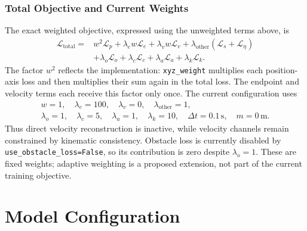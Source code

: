 \documentclass[12pt]{article}
\begin{document}
\subsubsection{Total Objective and Current Weights}
The exact weighted objective, expressed using the unweighted terms above, is
\begin{equation}
\begin{split}
\mathcal{L}_{\mathrm{total}}={}&w^2\mathcal{L}_{p}
 +\lambda_e w\mathcal{L}_{e}+\lambda_v w\mathcal{L}_{v}
 +\lambda_{\mathrm{other}}(\mathcal{L}_{s}+\mathcal{L}_{\eta})\\
 &+\lambda_o\mathcal{L}_{o}+\lambda_c\mathcal{L}_{c}
 +\lambda_a\mathcal{L}_{a}+\lambda_k\mathcal{L}_{k}.
\end{split}
\end{equation}
The factor $w^2$ reflects the implementation: \texttt{xyz\_weight} multiplies
each position-axis loss and then multiplies their sum again in the total loss.
The endpoint and velocity terms each receive this factor only once.
The current configuration uses
\begin{equation}
\begin{gathered}
w=1,\quad \lambda_e=100,\quad \lambda_v=0,\quad
\lambda_{\mathrm{other}}=1,\\
\lambda_o=1,\quad \lambda_c=5,\quad \lambda_a=1,\quad
\lambda_k=10,\quad \Delta t=0.1\,\mathrm{s},\quad m=0\,\mathrm{m}.
\end{gathered}
\end{equation}
Thus direct velocity reconstruction is inactive, while velocity channels remain
constrained by kinematic consistency. Obstacle loss is currently disabled by
\texttt{use\_obstacle\_loss=False}, so its contribution is zero despite
$\lambda_o=1$. These are fixed weights; adaptive weighting is a proposed
extension, not part of the current training objective.

\section{Model Configuration}
\end{document}
